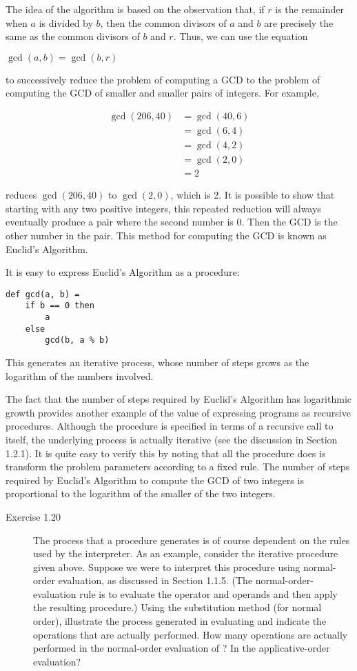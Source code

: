The idea of the algorithm is based on the observation that, if $r$ is the remainder when $a$ is divided by $b$, then the common divisors of $a$ and $b$ are precisely the same as the common divisors of $b$ and $r$. Thus, we can use the equation

$\gcd(a,b) = \gcd(b,r)$

to successively reduce the problem of computing a GCD to the problem of computing the GCD of smaller and smaller pairs of integers. For example,

\begin{align}
\gcd(206,40) &= \gcd(40,6) \\
&= \gcd(6,4) \\
&= \gcd(4,2) \\
&= \gcd(2,0) \\
&= 2
\end{align}

reduces $\gcd(206,40)$ to $\gcd(2,0)$, which is 2. It is possible to show that starting with any two positive integers, this repeated reduction will always eventually produce a pair where the second number is 0. Then the GCD is the other number in the pair. This method for computing the GCD is known as Euclid's Algorithm.

It is easy to express Euclid's Algorithm as a procedure:

\begin{lstlisting}
def gcd(a, b) =
    if b == 0 then
        a
    else
        gcd(b, a % b)
\end{lstlisting}

This generates an iterative process, whose number of steps grows as the logarithm of the numbers involved.

The fact that the number of steps required by Euclid's Algorithm has logarithmic growth provides another example of the value of expressing programs as recursive procedures. Although the procedure is specified in terms of a recursive call to itself, the underlying process is actually iterative (see the discussion in Section 1.2.1). It is quite easy to verify this by noting that all the procedure does is transform the problem parameters according to a fixed rule. The number of steps required by Euclid's Algorithm to compute the GCD of two integers is proportional to the logarithm of the smaller of the two integers.

\begin{description}
\item[Exercise 1.20] The process that a procedure generates is of course dependent on the rules used by the interpreter. As an example, consider the iterative  procedure given above. Suppose we were to interpret this procedure using normal-order evaluation, as discussed in Section 1.1.5. (The normal-order-evaluation rule is to evaluate the operator and operands and then apply the resulting procedure.) Using the substitution method (for normal order), illustrate the process generated in evaluating  and indicate the  operations that are actually performed. How many  operations are actually performed in the normal-order evaluation of ? In the applicative-order evaluation?
\end{description}

